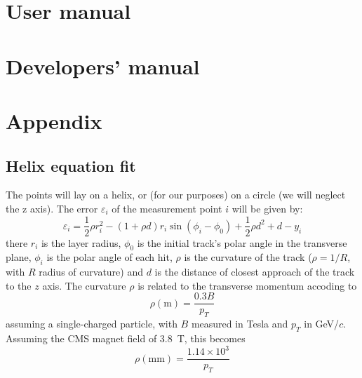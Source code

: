 \documentclass[10pt,a4paper]{article}
\begin{document}
\section{User manual}



\section{Developers' manual}
\section{Appendix}
\subsection{Helix equation fit}
The points will lay on a helix, or (for our purposes) on a circle (we
will neglect the z axis).  The error $\varepsilon_i$ of the
measurement point $i$ will be given by:
\begin{equation}
  \label{eq:helix}
  \varepsilon_i = \frac 1 2 \rho r_i^2 - (1 + \rho d) r_i \sin(\phi_i-\phi_0) + \frac 1 2 \rho d^2 + d -y_i
\end{equation}
there $r_i$ is the layer radius, $\phi_0$ is the initial track's polar
angle in the transverse plane, $\phi_i$ is the polar angle of each
hit, $\rho$ is the curvature of the track ($\rho=1/R$, with $R$ radius
of curvature) and $d$ is the distance of closest approach of the track
to the $z$ axis.  The curvature $\rho$ is related to the transverse
momentum accoding to
\begin{equation}
  \rho (\mathrm{m}) = \frac {0.3 B} {p_T} 
\end{equation}
assuming a single-charged particle, with $B$ measured in Tesla and
$p_T$ in GeV/$c$. Assuming the CMS magnet field of 3.8~T, this becomes
\begin{equation}
  \rho (\mathrm{mm}) = \frac {1.14\times 10^3} {p_T} 
\end{equation}
\end{document}
